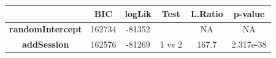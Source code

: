 \documentclass[]{article}
\begin{document}
\begin{longtable}[]{@{}cccccc@{}}
\toprule
\begin{minipage}[b]{0.25\columnwidth}\centering\strut
~\strut
\end{minipage} & \begin{minipage}[b]{0.10\columnwidth}\centering\strut
BIC\strut
\end{minipage} & \begin{minipage}[b]{0.10\columnwidth}\centering\strut
logLik\strut
\end{minipage} & \begin{minipage}[b]{0.10\columnwidth}\centering\strut
Test\strut
\end{minipage} & \begin{minipage}[b]{0.12\columnwidth}\centering\strut
L.Ratio\strut
\end{minipage} & \begin{minipage}[b]{0.13\columnwidth}\centering\strut
p-value\strut
\end{minipage}\tabularnewline
\midrule
\endhead
\begin{minipage}[t]{0.25\columnwidth}\centering\strut
\textbf{randomIntercept}\strut
\end{minipage} & \begin{minipage}[t]{0.10\columnwidth}\centering\strut
162734\strut
\end{minipage} & \begin{minipage}[t]{0.10\columnwidth}\centering\strut
-81352\strut
\end{minipage} & \begin{minipage}[t]{0.10\columnwidth}\centering\strut
\strut
\end{minipage} & \begin{minipage}[t]{0.12\columnwidth}\centering\strut
NA\strut
\end{minipage} & \begin{minipage}[t]{0.13\columnwidth}\centering\strut
NA\strut
\end{minipage}\tabularnewline
\begin{minipage}[t]{0.25\columnwidth}\centering\strut
\textbf{addSession}\strut
\end{minipage} & \begin{minipage}[t]{0.10\columnwidth}\centering\strut
162576\strut
\end{minipage} & \begin{minipage}[t]{0.10\columnwidth}\centering\strut
-81269\strut
\end{minipage} & \begin{minipage}[t]{0.10\columnwidth}\centering\strut
1 vs 2\strut
\end{minipage} & \begin{minipage}[t]{0.12\columnwidth}\centering\strut
167.7\strut
\end{minipage} & \begin{minipage}[t]{0.13\columnwidth}\centering\strut
2.317e-38\strut
\end{minipage}\tabularnewline
\bottomrule
\end{longtable}
\end{document}
